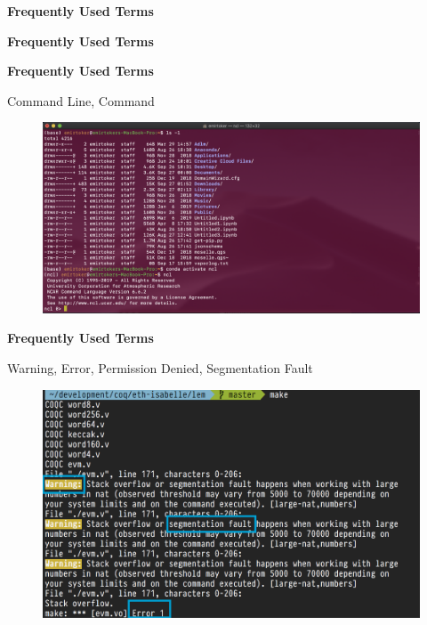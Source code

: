 \documentclass[ignorenonframetext,]{beamer}
\begin{document}
\begin{frame}[fragile]{\textbf{Frequently Used Terms}}
\begin{block}{\textbf{Frequently Used Terms}}
\end{block}

\begin{block}{\textbf{Frequently Used Terms}}

Command Line, Command

\begin{figure}
\centering
\includegraphics{command_line.png}
\caption{}
\end{figure}

\end{block}

\begin{block}{\textbf{Frequently Used Terms}}

Warning, Error, Permission Denied, Segmentation Fault

\begin{figure}
\centering
\includegraphics{warning.png}
\caption{}
\end{figure}

\end{block}

\end{frame}
\end{document}

